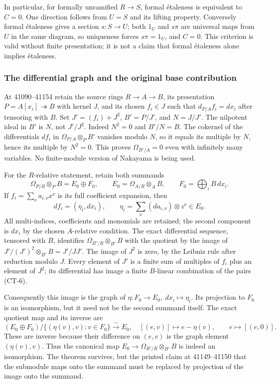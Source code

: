 In particular, for formally unramified \(R\to S\), formal étaleness is equivalent to \(C=0\). One direction follows from \(U=S\) and its lifting property. Conversely formal étaleness gives a section \(s:S\to U\); both \(1_U\) and \(s\pi\) are universal maps from \(U\) in the same diagram, so uniqueness forces \(s\pi=1_U\), and \(C=0\). This criterion is valid without finite presentation; it is not a claim that formal étaleness alone implies étaleness.

\subsubsection{The differential graph and the original base contribution}\label{algebra-proof-055-the-differential-graph-and-the-original-base-contribution}

At 41090--41154 retain the source rings \(R\to A\to B\), its presentation \(P=A[x_i]\twoheadrightarrow B\) with kernel \(J\), and its chosen \(f_i\in J\) such that \(d_{P/A}f_i=dx_i\) after tensoring with \(B\). Set \(J'=(f_i)+J^2\), \(B'=P/J'\), and \(N=J/J'\). The nilpotent ideal in \(B'\) is \(N\), not \(J'/J^2\). Indeed \(N^2=0\) and \(B'/N=B\). The cokernel of the differentials \(df_i\) in \(\Omega_{P/A}\otimes_PB'\) vanishes modulo \(N\), so it equals its multiple by \(N\), hence its multiple by \(N^2=0\). This proves \(\Omega_{B'/A}=0\) even with infinitely many variables. No finite-module version of Nakayama is being used.

For the \(R\)-relative statement, retain both summands \[
\Omega_{P/R}\otimes_PB=E_0\oplus F_0,\qquad
E_0=\Omega_{A/R}\otimes_AB,\qquad F_0=\bigoplus_iB\,dx_i.
\] If \(f_i=\sum_\nu a_{i,\nu}x^\nu\) is its full coefficient expansion, then \[
df_i=(\eta_i,dx_i),\qquad
\eta_i=\sum_\nu(da_{i,\nu})\otimes z^\nu\in E_0.
\tag{CT-6}
\] All multi-indices, coefficients and monomials are retained; the second component is \(dx_i\) by the chosen \(A\)-relative condition. The exact differential sequence, tensored with \(B\), identifies \(\Omega_{B'/R}\otimes_{B'}B\) with the quotient by the image of \(J'/(J')^2\otimes_{B'}B=J'/JJ'\). The image of \(J^2\) is zero, by the Leibniz rule after reduction modulo \(J\). Every element of \(J'\) is a finite sum of multiples of \(f_i\) plus an element of \(J^2\); its differential has image a finite \(B\)-linear combination of the pairs (CT-6).

Consequently this image is the graph of \(\eta:F_0\to E_0,\ dx_i\mapsto\eta_i\). Its projection to \(F_0\) is an isomorphism, but it need not be the second summand itself. The exact quotient map and its inverse are \[
(E_0\oplus F_0)/\{(\eta(v),v):v\in F_0\}
\xrightarrow{\sim}E_0,\quad [(e,v)]\mapsto e-\eta(v),
\qquad e\mapsto[(e,0)].
\tag{CT-7}
\] These are inverse because their difference on \((e,v)\) is the graph element \((\eta(v),v)\). Thus the canonical map \(E_0\to\Omega_{B'/R}\otimes_{B'}B\) is indeed an isomorphism. The theorem survives, but the printed claim at 41149--41150 that the submodule maps onto the summand must be replaced by projection of the image onto the summand.

